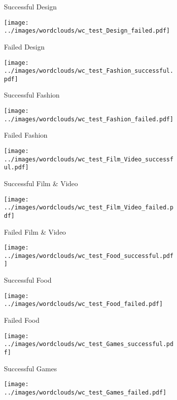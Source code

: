\documentclass{article}
\begin{document}
\begin{figure}
\begin{subfigure}[e]{0.2\linewidth}
    \caption{Successful Design}
    \label{fig:Design_s_test}
  \end{subfigure} 
  \begin{subfigure}[e']{0.2\linewidth}
    \centering\texttt{[image: ../images/wordclouds/wc\_test\_Design\_failed.pdf]}
    \caption{Failed Design}
    \label{fig:Design_f_test}
  \end{subfigure} 
    \begin{subfigure}[f]{0.2\linewidth}
    \centering\texttt{[image: ../images/wordclouds/wc\_test\_Fashion\_successful.pdf]}
    \caption{Successful Fashion}
    \label{fig:Fashion_s_test}
  \end{subfigure} 
  \begin{subfigure}[f']{0.2\linewidth}
    \centering\texttt{[image: ../images/wordclouds/wc\_test\_Fashion\_failed.pdf]}
    \caption{Failed Fashion}
    \label{fig:Fashion_f_test}
  \end{subfigure}
    \begin{subfigure}[g]{0.2\linewidth}
    \centering\texttt{[image: ../images/wordclouds/wc\_test\_Film\_Video\_successful.pdf]}
    \caption{Successful Film \& Video}
    \label{fig:Film_Video_s_test}
  \end{subfigure} 
  \begin{subfigure}[g']{0.2\linewidth}
    \centering\texttt{[image: ../images/wordclouds/wc\_test\_Film\_Video\_failed.pdf]}
    \caption{Failed Film \& Video}
    \label{fig:Film_Video_f_test}
  \end{subfigure}
    \begin{subfigure}[h]{0.2\linewidth}
    \centering\texttt{[image: ../images/wordclouds/wc\_test\_Food\_successful.pdf]}
    \caption{Successful Food}
    \label{fig:Food_s_test}
  \end{subfigure} 
  \begin{subfigure}[h']{0.2\linewidth}
    \centering\texttt{[image: ../images/wordclouds/wc\_test\_Food\_failed.pdf]}
    \caption{Failed Food}
    \label{fig:Food_f_test}
  \end{subfigure}
    \begin{subfigure}[i]{0.2\linewidth}
    \centering\texttt{[image: ../images/wordclouds/wc\_test\_Games\_successful.pdf]}
    \caption{Successful Games}
    \label{fig:Games_s_test}
  \end{subfigure} 
  \begin{subfigure}[i']{0.2\linewidth}
    \centering\texttt{[image: ../images/wordclouds/wc\_test\_Games\_failed.pdf]}

\end{subfigure}
\end{figure}
\end{document}
